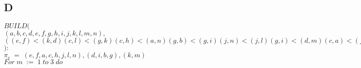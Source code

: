 \documentclass[paper=a4, fontsize=11pt]{scrartcl}
\newcommand\tab[1][1cm]{\hspace*{#1}}
\numberwithin{equation}{section}		%
\numberwithin{figure}{section}			%
\numberwithin{table}{section}				%
\begin{document}
\subsection*{D}

\iffalse
Run the algorithm on the following set of constraints
(e, f) < (k, d) (c, l) < (g, k) (c, h) < (a, n) (g, b) < (g, i) (j, n) < (j, l) (g, i) < (d, m) (c, a) < (f, h) (c, h) < (c, a) (j, l) < (e, n) (e, f) < (h, l) (n, l) < (a, f) (j, l) < (j, a) (d, i) < (k, n) (k, m) < (e, i) (d, i) < (g, i) (j, n) < (j, f)
You should show the partitioning and the recursive calls at each stage.

\begin{center}
1 - (e, f) < (k, d)\\
2- (c, h) < (a, n)\\
3 - (j, n) < (j, l)\\
4 - (c, a) < (f, h)\\
5 - (j, l) < (e, n)\\
6 - (n, l) < (a, f)\\
7 - (d, i) < (k, n)\\
8 - (d, i) < (g, i)\\
9 - (c, l) < (g, k)\\
10 - (g, b) < (g, i)\\
11 - (g, i) < (d, m)\\
12 - (c, h) < (c, a)\\
13 - (e, f) < (h, l)\\
14 -  (j, l) < (j, a)\\
15 - (k, m) < (e, i)\\
16 -  (j, n) < (j, f)\\
\end{center}
\fi

\noindent
$BUILD($\\
\tab$(a,b,c,d,e,f,g,h,i,j,k,l,m,n),$\\
\tab$((e, f) < (k, d) (c, l) < (g, k) (c, h) < (a, n) (g, b) < (g, i) (j, n) < (j, l) (g, i) < (d, m) (c, a) < (f, h) (c, h) < (c, a) (j, l) < (e, n) (e, f) < (h, l) (n, l) < (a, f) (j, l) < (j, a) (d, i) < (k, n) (k, m) < (e, i) (d, i) < (g, i) (j, n) < (j, f))$\\
$):$\\


\noindent
\tab$\pi_c\;=\;(e,f,a,c,h,j,l,n),(d,i,b,g),(k,m)$\\


\noindent
\tab$For\;m\;:=\;1\;to\;3\;do$\\
\end{document}
